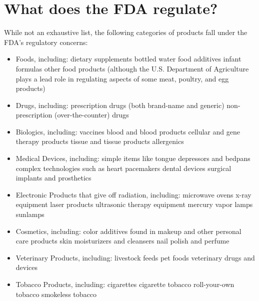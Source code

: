 \documentclass[11pt]{book}
\begin{document}
\section{What does the FDA regulate?}
While not an exhaustive list, the following categories of products fall under the FDA's regulatory concerns:
\begin{itemize}
	\item Foods, including:
	\subitem dietary supplements
	\subitem bottled water
	\subitem food additives
	\subitem infant formulas
	\subitem other food products (although the U.S. Department of Agriculture plays a lead role in regulating aspects of some meat, poultry, and egg products)
	\item Drugs, including:
	\subitem prescription drugs (both brand-name and generic)
	\subitem non-prescription (over-the-counter) drugs
	\item Biologics, including:
	\subitem vaccines
	\subitem blood and blood products
	\subitem cellular and gene therapy products
	\subitem tissue and tissue products
	\subitem allergenics
	\item Medical Devices, including:
	\subitem simple items like tongue depressors and bedpans
	\subitem complex technologies such as heart pacemakers
	\subitem dental devices
	\subitem surgical implants and prosthetics
	\item Electronic Products that give off radiation, including:
	\subitem microwave ovens
	\subitem x-ray equipment
	\subitem laser products
	\subitem ultrasonic therapy equipment
	\subitem mercury vapor lamps
	\subitem sunlamps
	\item Cosmetics, including:
	\subitem color additives found in makeup and other personal care products
	\subitem skin moisturizers and cleansers
	\subitem nail polish and perfume
	\item Veterinary Products, including:
	\subitem livestock feeds
	\subitem pet foods
	\subitem veterinary drugs and devices
	\item Tobacco Products, including:
	\subitem cigarettes
	\subitem cigarette tobacco
	\subitem roll-your-own tobacco
	\subitem smokeless tobacco
\end{itemize}
\end{document}
